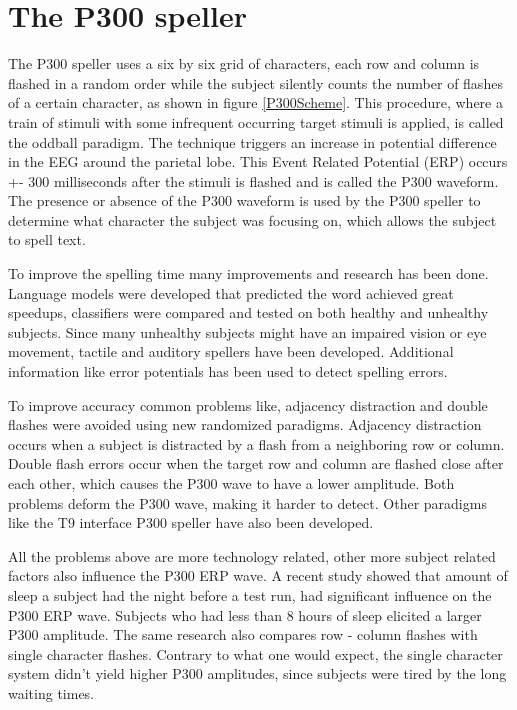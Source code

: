 \section{The P300 speller}
The P300 speller uses a six by six grid of characters, each row and column is flashed in a random order while the subject silently counts the number of flashes of a certain character, as shown in figure \ref{P300Scheme}. This procedure, where a train of stimuli with some infrequent occurring target stimuli is applied, is called the oddball paradigm. The technique triggers an increase in potential difference in the EEG around the parietal lobe. This Event Related Potential (ERP) occurs +- 300 milliseconds after the stimuli is flashed and is called the P300 waveform\cite{ComparisonClassifications}. The presence or absence of the P300 waveform is used by the P300 speller to determine what character the subject was focusing on, which allows the subject to spell text. 


To improve the spelling time many improvements and research has been done. Language models were developed that predicted the word achieved great speedups\cite{LangModel}, classifiers were compared and tested on both healthy\cite{ClassTechniqueComp} and unhealthy subjects\cite{ComparisonClassifications}. Since many unhealthy subjects might have an impaired vision or eye movement, tactile\cite{TactileP300} and auditory\cite{AuditoryP300} spellers have been developed. Additional information like error potentials has been used to detect spelling errors\cite{ErrorPotentials}. 

\npar

To improve accuracy common problems like, adjacency distraction and double flashes were avoided using new randomized paradigms\cite{PaperThibault}. Adjacency distraction occurs when a subject is distracted by a flash from a neighboring row or column. Double flash errors occur when the target row and column are flashed close after each other, which causes the P300 wave to have a lower amplitude. Both problems deform the P300 wave, making it harder to detect. Other paradigms like the T9 interface P300 speller have also been developed\cite{P300T9}.

\npar

All the problems above are more technology related, other more subject related factors also influence the P300 ERP wave. A recent study showed that amount of sleep a subject had the night before a test run, had significant influence on the P300 ERP wave. Subjects who had less than 8 hours of sleep elicited a larger P300 amplitude\cite{HowManyPeople}. The same research also compares row - column flashes with single character flashes. Contrary to what one would expect, the single character system didn't yield higher P300 amplitudes, since subjects were tired by the long waiting times. 





